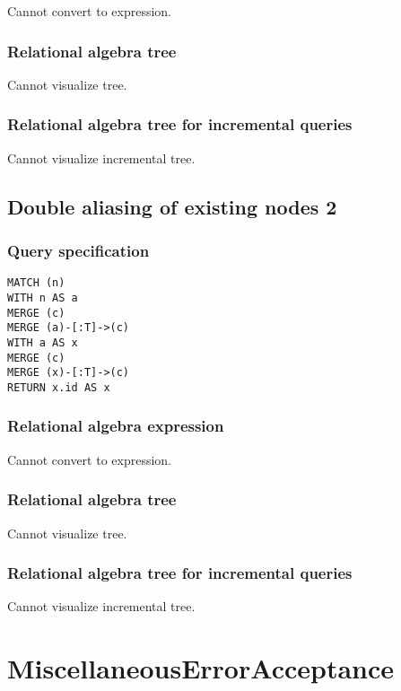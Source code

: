 Cannot convert to expression.

\subsubsection*{Relational algebra tree}

Cannot visualize tree.

\subsubsection*{Relational algebra tree for incremental queries}

Cannot visualize incremental tree.

\subsection{Double aliasing of existing nodes 2}

\subsubsection*{Query specification}

\begin{lstlisting}
MATCH (n)
WITH n AS a
MERGE (c)
MERGE (a)-[:T]->(c)
WITH a AS x
MERGE (c)
MERGE (x)-[:T]->(c)
RETURN x.id AS x
\end{lstlisting}

\subsubsection*{Relational algebra expression}

Cannot convert to expression.

\subsubsection*{Relational algebra tree}

Cannot visualize tree.

\subsubsection*{Relational algebra tree for incremental queries}

Cannot visualize incremental tree.

\section{MiscellaneousErrorAcceptance}

